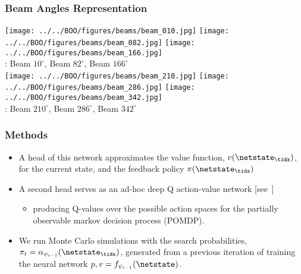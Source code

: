 \begin{frame}
	\frametitle{Beam Angles Representation}
		\centering
		\texttt{[image: ../../BOO/figures/beams/beam\_010.jpg]}
		\texttt{[image: ../../BOO/figures/beams/beam\_082.jpg]} 
		\texttt{[image: ../../BOO/figures/beams/beam\_166.jpg]} \\
		: Beam $10^\circ$, Beam $82^\circ$, Beam $166^\circ$ \\
		\texttt{[image: ../../BOO/figures/beams/beam\_210.jpg]}
		\texttt{[image: ../../BOO/figures/beams/beam\_286.jpg]}
		\texttt{[image: ../../BOO/figures/beams/beam\_342.jpg]}
		\\
		: Beam $210^\circ$, Beam $286^\circ$, Beam $342^\circ$ \\
\end{frame}


\begin{frame}
	\frametitle{Methods}
	\begin{itemize}
		\item A head of this network approximates the value function, $v(\netstate_\tidx)$, for the current state, and the feedback policy $\pi(\netstate_\tidx)$
		\item A second head serves as an ad-hoc deep Q action-value network [see~\cite{atarigames}] 
		\begin{itemize}
			\item producing Q-values over the possible action spaces for the partially observable markov decision process (POMDP).
		\end{itemize}
	\item We run Monte Carlo simulations with the search probabilities, $\pi_t = \alpha_{\psi_{i-1}}(\netstate_\tidx)$, generated from a previous iteration of training the neural network $p, v = f_{\psi_{i-1}}(\netstate)$.
	\end{itemize}
\end{frame}

